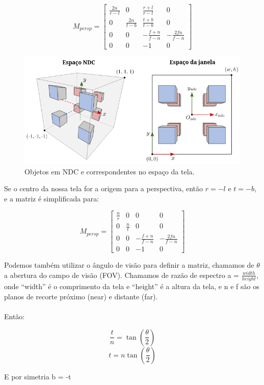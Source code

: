 \documentclass[12pt]{article}
\begin{document}
\[
M_{persp} =
\begin{bmatrix}
    \frac{2n}{r-l} & 0 & \frac{r+l}{r-l} & 0 \\    
    0 & \frac{2n}{t-b} & \frac{t+b}{t-b} & 0 \\    
    0 & 0 & -\frac{f+n}{f-n} & -\frac{2fn}{f-n} \\
    0 & 0 & -1 & 0 
\end{bmatrix}    
\]

\begin{figure}[H]
    \centering
    \includegraphics[height=0.4\linewidth]{imgs/Screenshot 2023-11-20 at 22-32-44 8.2 Projeção perspectiva MCTA008-17 Computação Gráfica.png}
    \caption{Objetos em NDC e correspondentes no espaço da tela.}
\end{figure}

\noindent
Se o centro da nossa tela for a origem para a perspectiva, então $r = -l$ e $t = -b$, e a matriz é simplificada para:

\[
M_{persp} =
\begin{bmatrix}
    \frac{n}{r} & 0 & 0 & 0 \\    
    0 & \frac{n}{t} & 0 & 0 \\    
    0 & 0 & -\frac{f+n}{f-n} & -\frac{2fn}{f-n} \\
    0 & 0 & -1 & 0 
\end{bmatrix}    
\]


Podemos também utilizar o ângulo de visão para definir a matriz, chamamos de $\theta$ a abertura do campo de visão (FOV). Chamamos de razão de espectro a = $\frac{width}{height}$, onde ``width'' é o comprimento da tela e ``height'' é a altura da tela, e n e f são os planos de recorte próximo  (near) e distante (far).
\\~\\
Então:

\[
\frac{t}{n} = \tan(\frac{\theta}{2})    
\]
\[
t = n\tan(\frac{\theta}{2})    
\]

E por simetria b = -t
\end{document}
